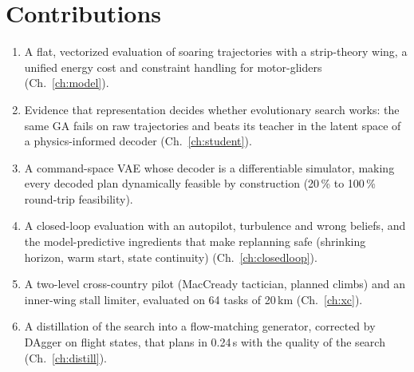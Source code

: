 \documentclass[11pt,a4paper,oneside]{report}
\begin{document}
\section{Contributions}
\begin{enumerate}
  \item A flat, vectorized evaluation of soaring trajectories with a strip-theory wing, a unified energy cost and constraint handling for motor-gliders (Ch.~\ref{ch:model}).
  \item Evidence that representation decides whether evolutionary search works: the same GA fails on raw trajectories and beats its teacher in the latent space of a physics-informed decoder (Ch.~\ref{ch:student}).
  \item A command-space VAE whose decoder is a differentiable simulator, making every decoded plan dynamically feasible by construction (20\,\% to 100\,\% round-trip feasibility).
  \item A closed-loop evaluation with an autopilot, turbulence and wrong beliefs, and the model-predictive ingredients that make replanning safe (shrinking horizon, warm start, state continuity) (Ch.~\ref{ch:closedloop}).
  \item A two-level cross-country pilot (MacCready tactician, planned climbs) and an inner-wing stall limiter, evaluated on 64 tasks of 20\,km (Ch.~\ref{ch:xc}).
  \item A distillation of the search into a flow-matching generator, corrected by DAgger on flight states, that plans in 0.24\,s with the quality of the search (Ch.~\ref{ch:distill}).
\end{enumerate}
\end{document}
